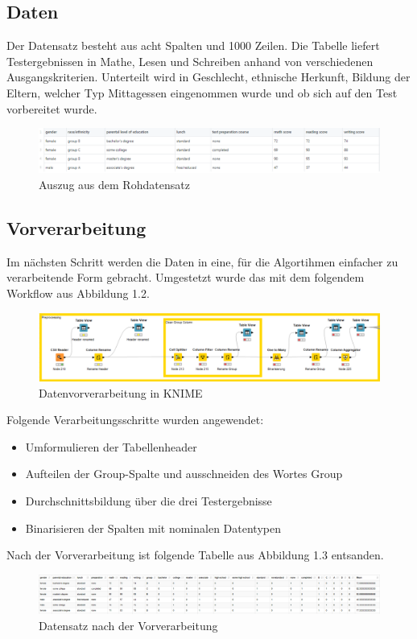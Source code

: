 \documentclass[12pt,					%
							 oneside,			%
							 a4paper,			%
							 halfparskip,		%
							 liststotoc,			%
							 bibtotoc,			%
							 fleqn,				%
							 pointlessnumbers]	%
							 {scrreprt}
\begin{document}
	\subsection{Daten}
	Der Datensatz besteht aus acht Spalten und 1000 Zeilen.  Die Tabelle liefert Testergebnissen in Mathe, Lesen und Schreiben anhand von verschiedenen Ausgangskriterien. Unterteilt wird in Geschlecht, ethnische Herkunft, Bildung der Eltern, welcher Typ Mittagessen eingenommen wurde und ob sich auf den Test vorbereitet wurde. 
	\begin{figure}[!h]
		\includegraphics[scale=0.65]{pictures/roh.png}
		\caption{Auszug aus dem Rohdatensatz}
	\end{figure}
	\subsection{Vorverarbeitung}
	Im nächsten Schritt werden die Daten in eine, für die Algortihmen einfacher zu verarbeitende Form gebracht. Umgestetzt wurde das mit dem folgendem Workflow aus Abbildung 1.2.
	
	\begin{figure}[!h]
		\includegraphics[scale=0.50]{pictures/preprocessing.png}
		\caption{Datenvorverarbeitung in KNIME}
	\end{figure}
	
	Folgende Verarbeitungsschritte wurden angewendet:
	\begin{itemize}
	\item Umformulieren der Tabellenheader
	\item Aufteilen der Group-Spalte und ausschneiden des Wortes Group
	\item Durchschnittsbildung über die drei Testergebnisse
	\item Binarisieren der Spalten mit nominalen Datentypen
	\end{itemize}
	\newpage
	Nach der Vorverarbeitung ist folgende Tabelle aus Abbildung 1.3 entsanden.
	
	\begin{figure}[!h]
		\includegraphics[scale=0.47]{pictures/processed.png}
		\caption{Datensatz nach der Vorverarbeitung }
	\end{figure}
	
\end{document}
